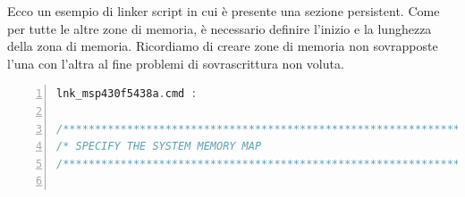 \documentclass[LaM,binding=0.6cm,oneside]{../sapthesis}
\begin{document}
Ecco un esempio di linker script in cui è presente una sezione persistent.
Come per tutte le altre zone di memoria, è necessario definire l'inizio e la lunghezza della zona di memoria. Ricordiamo 
di creare zone di memoria non sovrapposte l'una con l'altra al fine problemi di sovrascrittura non voluta.
\begin{lstlisting}[language=C,
                   basicstyle=\scriptsize,
                   numbers=left,
                   stepnumber=0,
                   numbersep=4pt,
                   tabsize=2,
                   showspaces=false,
                   showstringspaces=false]
    lnk_msp430f5438a.cmd :
    
/****************************************************************************/
/* SPECIFY THE SYSTEM MEMORY MAP                                            */
/****************************************************************************/


\end{lstlisting}
\end{document}
